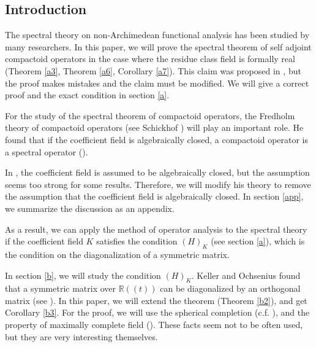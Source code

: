 \documentclass[12pt]{amsart}
\theoremstyle{plain}
\theoremstyle{definition}
\begin{document}
\subsection{Introduction}
The spectral theory on non-Archimedean functional analysis has been studied by many researchers. In this paper, we will prove the spectral theorem of self adjoint compactoid operators in the case where the residue class field is formally real (Theorem \ref{a3}, Theorem \ref{a6}, Corollary \ref{a7}). This claim was proposed in \cite[Theorem 4.3]{sp}, but the proof makes mistakes and the claim must be modified. We will give a correct proof and the exact condition in section \ref{a}. \par
For the study of the spectral theorem of compactoid operators, the Fredholm theory of compactoid operators (see Schickhof \cite{comp}) will play an important role. He found that if the coefficient field is algebraically closed, a compactoid operator is a spectral operator (\cite[Defnition 6.5]{comp}). \par
In \cite[section 6]{comp}, the coefficient field is assumed to be algebraically closed, but the assumption seems too strong for some results. Therefore, we will modify his theory to remove the assumption that the coefficient field is algebraically closed. In section \ref{app}, we summarize the discussion as an appendix. \par
As a result, we can apply the method of operator analysis to the spectral theory if the coefficient field $K$ satisfies the condition $(H)_K$ (see section \ref{a}), which is the condition on the diagonalization of a symmetric matrix. \par
In section \ref{b}, we will study the condition $(H)_K$. Keller and Ochsenius found that a symmetric matrix over $\mathbb{R}((t))$ can be diagonalized by an orthogonal matrix (see \cite{spect}). In this paper, we will extend the theorem (Theorem \ref{b2}), and get Corollary \ref{b3}. For the proof, we will use the spherical completion (c.f. \cite{van}), and the property of maximally complete field (\cite{kap}). These facts seem not to be often used, but they are very interesting themselves.
\end{document}
